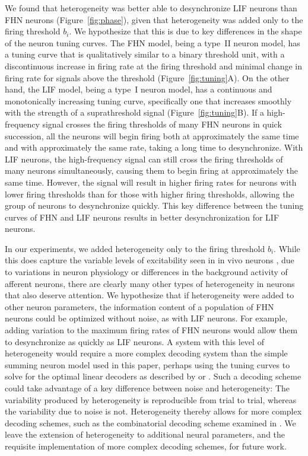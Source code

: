 \documentclass[12pt]{article}
\begin{document}
We found that heterogeneity was better able to desynchronize
LIF neurons than FHN neurons (Figure~\ref{fig:phase}),
given that heterogeneity was added only to the firing threshold $b_i$.
We hypothesize that this is due to key differences in the shape of the neuron tuning curves.
The FHN model, being a type~II neuron model,
has a tuning curve that is qualitatively similar to a binary threshold unit,
with a discontinuous increase in firing rate at the firing threshold
and minimal change in firing rate for signals above the threshold (Figure~\ref{fig:tuning}A).
On the other hand, the LIF model, being a type~I neuron model,
has a continuous and monotonically increasing tuning curve,
specifically one that increases smoothly with the strength of a
suprathreshold signal (Figure~\ref{fig:tuning}B).
If a high-frequency signal crosses the firing thresholds of many FHN neurons in quick succession, all the neurons will begin firing both at approximately the same time and with approximately the same rate, taking a long time to desynchronize. With LIF neurons, the high-frequency signal can still cross the firing thresholds of many neurons simultaneously, causing them to begin firing at approximately the same time. However, the signal will result in higher firing rates for neurons with lower firing thresholds than for those with higher firing thresholds, allowing the group of neurons to desynchronize quickly. This key difference between the tuning curves of FHN and LIF neurons results in better desynchronization for LIF neurons.

In our experiments, we added heterogeneity only to the firing threshold $b_i$. While this does capture the variable levels of excitability seen in in vivo neurons \citep{Mejias2012}, due to variations in neuron physiology or differences in the background activity of afferent neurons, there are clearly many other types of heterogeneity in neurons that also deserve attention.
We hypothesize that if heterogeneity were added to other neuron parameters,
the information content of a population of FHN neurons could be optimized without noise, as with LIF neurons.
For example, adding variation to the maximum firing rates of FHN neurons would allow them to desynchronize as quickly as LIF neurons. A system with this level of heterogeneity would require a more complex decoding system than the simple summing neuron model used in this paper, perhaps using the tuning curves to solve for the optimal linear decoders as described by \cite{Salinas1994} or \cite{Eliasmith2003}. Such a decoding scheme could take advantage of a key difference between noise and heterogeneity: The variability produced by heterogeneity is reproducible from trial to trial, whereas the variability due to noise is not. Heterogeneity thereby allows for more complex decoding schemes, such as the combinatorial decoding scheme examined in \cite{Osborne2008}. We leave the extension of heterogeneity to additional neural parameters, and the requisite implementation of more complex decoding schemes, for future work.
\end{document}
